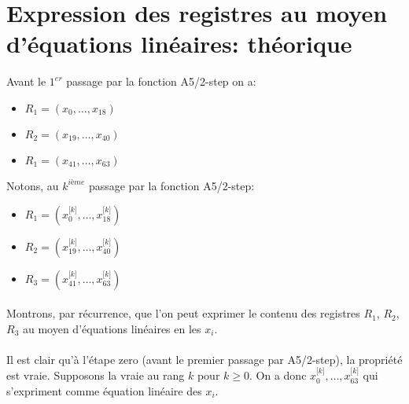 \section{Expression des registres au moyen d’équations linéaires: théorique}


Avant le $1^{er}$ passage par la fonction A5/2-step on a: 
\begin{itemize}
\item $R_1 = (x_0, \ldots, x_{18})$
\item $R_2 = (x_{19}, \ldots, x_{40})$
\item $R_1 = (x_{41}, \ldots, x_{63})$
\end{itemize}

Notons, au $k^{ième}$ passage par la fonction A5/2-step:
\begin{itemize}
\item $R_1 = (x^{\lbrack k\rbrack}_0, \ldots, x^{\lbrack k \rbrack}_{18})$
\item $R_2 = (x^{\lbrack k \rbrack}_{19}, \ldots, x^{\lbrack k \rbrack}_{40})$
\item $R_3 = (x^{\lbrack k \rbrack}_{41}, \ldots, x^{\lbrack k \rbrack}_{63})$
\end{itemize}
\paragraph{}
Montrons, par récurrence, que l'on peut exprimer le contenu des registres $R_1$, $R_2$, $R_3$ au moyen d'équations linéaires en les $x_i$.
\paragraph{}
Il est clair qu'à l'étape zero (avant le premier passage par A5/2-step), la propriété est vraie.
Supposons la vraie au rang $k$ pour $k \geq 0$.
On a donc $x^{\lbrack k\rbrack}_0, \ldots, x^{\lbrack k \rbrack}_{63}$ qui s'expriment comme équation linéaire des $x_i$.
